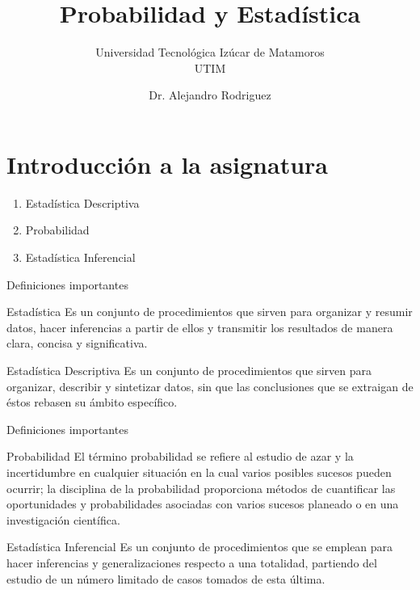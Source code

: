 \documentclass[11pt]{beamer}
\author{Dr. Alejandro Rodriguez}
\title{Probabilidad y Estad\'istica}
\subtitle{Universidad Tecnol\'ogica Iz\'ucar de Matamoros\\UTIM }
\begin{document}
  \begin{frame}[plain]
    \maketitle
  \end{frame}
  \section{Introducción a la asignatura}
    \begin{frame}
      \begin{enumerate}
        \item Estadística Descriptiva
        \item Probabilidad
        \item Estadística Inferencial
      \end{enumerate}
    \end{frame}

    \begin{frame}{Definiciones importantes}

      \begin{block}{Estad\'istica}
        Es un conjunto de procedimientos que sirven para organizar y resumir datos, hacer inferencias a partir de ellos y transmitir los resultados de manera clara, concisa y significativa.
      \end{block}
      \pause
      \begin{block}{Estadística Descriptiva}
        Es un conjunto de procedimientos que sirven para organizar, describir y sintetizar datos, sin que las conclusiones que se extraigan de \'estos rebasen su \'ambito     específico.
      \end{block}


    \end{frame}

    \begin{frame}{Definiciones importantes}

        \begin{block}{Probabilidad}
            El término probabilidad se refiere al estudio de azar y la incertidumbre en cualquier situación en la cual varios posibles sucesos pueden ocurrir; la disciplina de la probabilidad proporciona métodos de cuantificar las oportunidades y probabilidades asociadas con varios sucesos planeado o en una investigación científica.
        \end{block}
        \pause
        \begin{block}{Estadística Inferencial}
          Es un conjunto de procedimientos que se emplean para hacer inferencias y  generalizaciones respecto a una totalidad, partiendo del estudio de un n\'umero limitado de casos tomados de esta \'ultima.
        \end{block}

    \end{frame}
\end{document}
